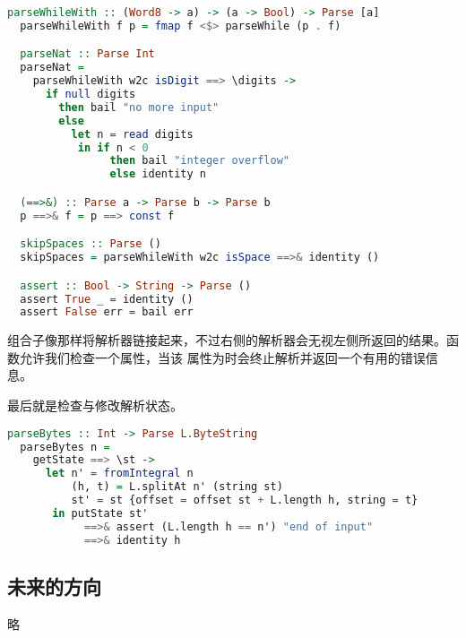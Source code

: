 \documentclass[./main.tex]{subfiles}
\begin{document}
\begin{lstlisting}[language=Haskell]
  parseWhileWith :: (Word8 -> a) -> (a -> Bool) -> Parse [a]
  parseWhileWith f p = fmap f <$> parseWhile (p . f)

  parseNat :: Parse Int
  parseNat =
    parseWhileWith w2c isDigit ==> \digits ->
      if null digits
        then bail "no more input"
        else
          let n = read digits
           in if n < 0
                then bail "integer overflow"
                else identity n

  (==>&) :: Parse a -> Parse b -> Parse b
  p ==>& f = p ==> const f

  skipSpaces :: Parse ()
  skipSpaces = parseWhileWith w2c isSpace ==>& identity ()

  assert :: Bool -> String -> Parse ()
  assert True _ = identity ()
  assert False err = bail err
\end{lstlisting}

\acode{(==>&)}组合子像\acode{(==>)}那样将解析器链接起来，不过右侧的解析器会无视左侧所返回的结果。函数允许我们检查一个属性，当该
属性为时会终止解析并返回一个有用的错误信息。

最后就是检查与修改解析状态。

\begin{lstlisting}[language=Haskell]
  parseBytes :: Int -> Parse L.ByteString
  parseBytes n =
    getState ==> \st ->
      let n' = fromIntegral n
          (h, t) = L.splitAt n' (string st)
          st' = st {offset = offset st + L.length h, string = t}
       in putState st'
            ==>& assert (L.length h == n') "end of input"
            ==>& identity h
\end{lstlisting}

\subsection*{未来的方向}

略
\end{document}
